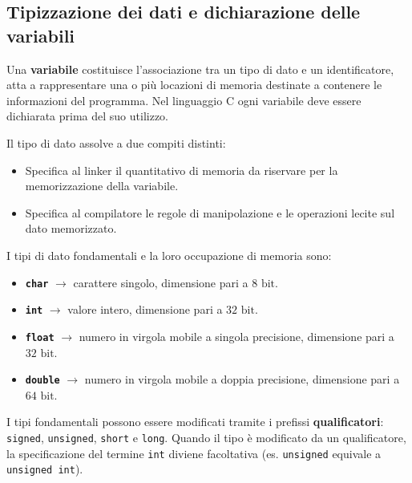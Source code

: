 \subsection{Tipizzazione dei dati e dichiarazione delle variabili}
Una \textbf{variabile} costituisce l'associazione tra un tipo di dato e un identificatore, atta a rappresentare una o più locazioni di memoria destinate a contenere le informazioni del programma. Nel linguaggio C ogni variabile deve essere dichiarata prima del suo utilizzo.

Il tipo di dato assolve a due compiti distinti:
\begin{itemize}
    \item Specifica al linker il quantitativo di memoria da riservare per la memorizzazione della variabile.
    \item Specifica al compilatore le regole di manipolazione e le operazioni lecite sul dato memorizzato.
\end{itemize}

I tipi di dato fondamentali e la loro occupazione di memoria sono:
\begin{itemize}
    \item \textbf{\texttt{char}} $\rightarrow$ carattere singolo, dimensione pari a $8\text{ bit}$.
    \item \textbf{\texttt{int}} $\rightarrow$ valore intero, dimensione pari a $32\text{ bit}$.
    \item \textbf{\texttt{float}} $\rightarrow$ numero in virgola mobile a singola precisione, dimensione pari a $32\text{ bit}$.
    \item \textbf{\texttt{double}} $\rightarrow$ numero in virgola mobile a doppia precisione, dimensione pari a $64\text{ bit}$.
\end{itemize}

I tipi fondamentali possono essere modificati tramite i prefissi \textbf{qualificatori}: \texttt{signed}, \texttt{unsigned}, \texttt{short} e \texttt{long}. Quando il tipo è modificato da un qualificatore, la specificazione del termine \texttt{int} diviene facoltativa (es. \texttt{unsigned} equivale a \texttt{unsigned int}).

